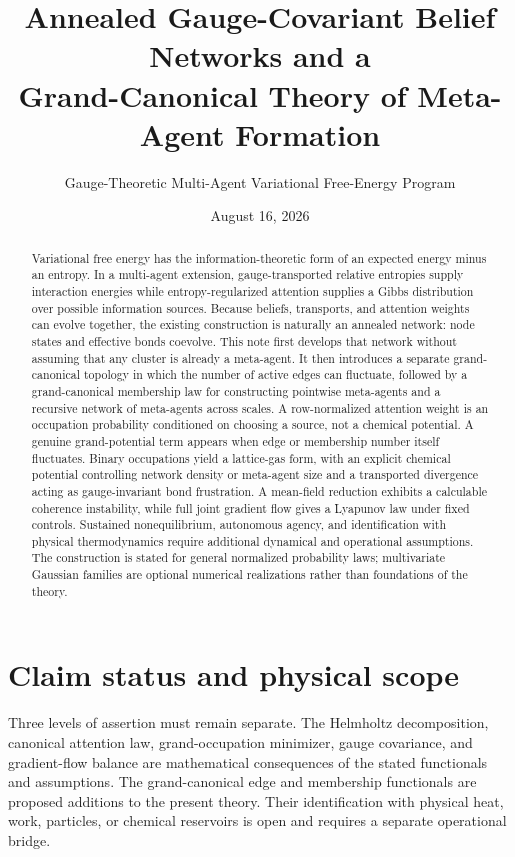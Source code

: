 \documentclass[11pt,letterpaper]{article}
\title{Annealed Gauge-Covariant Belief Networks and a\\
Grand-Canonical Theory of Meta-Agent Formation}
\author{Gauge-Theoretic Multi-Agent Variational Free-Energy Program}
\date{August 16, 2026}
\begin{document}
\maketitle

\begin{abstract}
Variational free energy has the information-theoretic form of an expected energy minus an entropy.  In a multi-agent extension, gauge-transported relative entropies supply interaction energies while entropy-regularized attention supplies a Gibbs distribution over possible information sources.  Because beliefs, transports, and attention weights can evolve together, the existing construction is naturally an annealed network: node states and effective bonds coevolve.  This note first develops that network without assuming that any cluster is already a meta-agent.  It then introduces a separate grand-canonical topology in which the number of active edges can fluctuate, followed by a grand-canonical membership law for constructing pointwise meta-agents and a recursive network of meta-agents across scales.  A row-normalized attention weight is an occupation probability conditioned on choosing a source, not a chemical potential.  A genuine grand-potential term appears when edge or membership number itself fluctuates.  Binary occupations yield a lattice-gas form, with an explicit chemical potential controlling network density or meta-agent size and a transported divergence acting as gauge-invariant bond frustration.  A mean-field reduction exhibits a calculable coherence instability, while full joint gradient flow gives a Lyapunov law under fixed controls.  Sustained nonequilibrium, autonomous agency, and identification with physical thermodynamics require additional dynamical and operational assumptions.  The construction is stated for general normalized probability laws; multivariate Gaussian families are optional numerical realizations rather than foundations of the theory.
\end{abstract}

\section{Claim status and physical scope}

Three levels of assertion must remain separate.  The Helmholtz decomposition, canonical attention law, grand-occupation minimizer, gauge covariance, and gradient-flow balance are mathematical consequences of the stated functionals and assumptions.  The grand-canonical edge and membership functionals are proposed additions to the present theory.  Their identification with physical heat, work, particles, or chemical reservoirs is open and requires a separate operational bridge.
\end{document}
